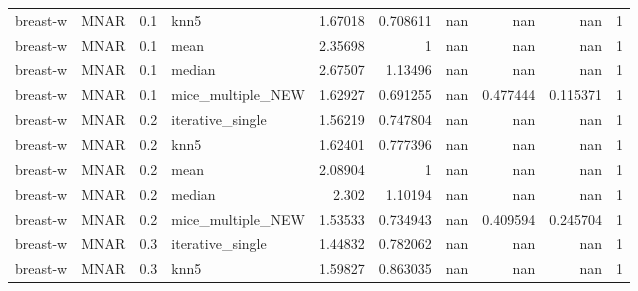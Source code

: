 \begin{table}[ht]
\begin{tabular}{llrlrrrrrr}
 breast-w        & MNAR        &         0.1 & knn5              &       1.67018  &             0.708611 &            nan         &                       nan        &                    nan         &         1 \\
 breast-w        & MNAR        &         0.1 & mean              &       2.35698  &             1        &            nan         &                       nan        &                    nan         &         1 \\
 breast-w        & MNAR        &         0.1 & median            &       2.67507  &             1.13496  &            nan         &                       nan        &                    nan         &         1 \\
 breast-w        & MNAR        &         0.1 & mice\_multiple\_NEW &       1.62927  &             0.691255 &            nan         &                         0.477444 &                      0.115371  &         1 \\
 breast-w        & MNAR        &         0.2 & iterative\_single  &       1.56219  &             0.747804 &            nan         &                       nan        &                    nan         &         1 \\
 breast-w        & MNAR        &         0.2 & knn5              &       1.62401  &             0.777396 &            nan         &                       nan        &                    nan         &         1 \\
 breast-w        & MNAR        &         0.2 & mean              &       2.08904  &             1        &            nan         &                       nan        &                    nan         &         1 \\
 breast-w        & MNAR        &         0.2 & median            &       2.302    &             1.10194  &            nan         &                       nan        &                    nan         &         1 \\
 breast-w        & MNAR        &         0.2 & mice\_multiple\_NEW &       1.53533  &             0.734943 &            nan         &                         0.409594 &                      0.245704  &         1 \\
 breast-w        & MNAR        &         0.3 & iterative\_single  &       1.44832  &             0.782062 &            nan         &                       nan        &                    nan         &         1 \\
 breast-w        & MNAR        &         0.3 & knn5              &       1.59827  &             0.863035 &            nan         &                       nan        &                    nan         &         1 \\

\end{tabular}
\end{table}
